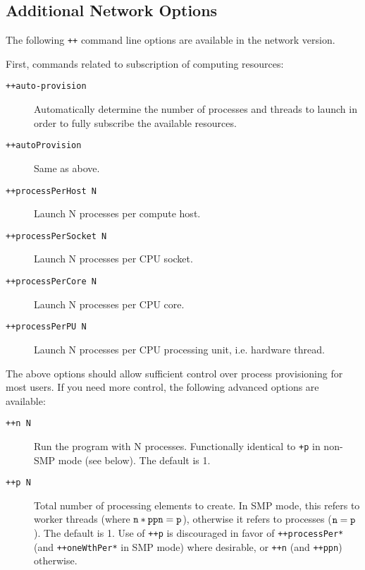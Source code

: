 \subsection{Additional Network Options}
\label{network command line options}

The following {\tt ++} command line options are available in
the network version.

First, commands related to subscription of computing resources:

\begin{description}

\item[{\tt ++auto-provision}] Automatically determine the number of processes
and threads to launch in order to fully subscribe the available resources.

\item[{\tt ++autoProvision}] Same as above.

\item[{\tt ++processPerHost N}] Launch N processes per compute host.

\item[{\tt ++processPerSocket N}] Launch N processes per CPU socket.

\item[{\tt ++processPerCore N}] Launch N processes per CPU core.

\item[{\tt ++processPerPU N}] Launch N processes per CPU processing unit, i.e.
hardware thread.

\end{description}

The above options should allow sufficient control over process provisioning
for most users. If you need more control, the following advanced options are
available:

\begin{description}

\item[{\tt ++n N}] Run the program with N processes. Functionally identical to
{\tt +p} in non-SMP mode (see below). The default is 1.

\item[{\tt ++p N}] Total number of processing elements to create. In SMP mode,
this refers to worker threads (where ${\tt n} * {\tt ppn} = {\tt p}$),
otherwise it refers to processes (${\tt n} = {\tt p}$). The default is 1.
Use of {\tt ++p} is discouraged in favor of {\tt ++processPer*} (and
{\tt ++oneWthPer*} in SMP mode) where desirable, or {\tt ++n} (and
{\tt ++ppn}) otherwise.

\end{description}

